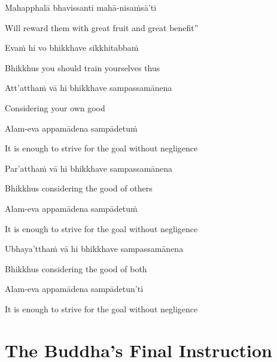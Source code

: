 Mahapphalā bhavissanti mahā-nisaṁsā'ti

\begin{cprenglish}
  Will reward them with great fruit and great benefit”
\end{cprenglish}

Evaṁ hi vo bhikkhave sikkhitabbaṁ

\begin{cprenglish}
  Bhikkhus you should train yourselves thus
\end{cprenglish}

Att’atthaṁ vā hi bhikkhave sampassamānena

\begin{cprenglish}
  Considering your own good
\end{cprenglish}

Alam-eva appamādena sampādetuṁ

\begin{cprenglish}
  It is enough to strive for the goal without negligence
\end{cprenglish}

Par’atthaṁ vā hi bhikkhave sampassamānena

\begin{cprenglish}
  Bhikkhus considering the good of others
\end{cprenglish}

Alam-eva appamādena sampādetuṁ

\begin{cprenglish}
  It is enough to strive for the goal without negligence
\end{cprenglish}

Ubhaya’tthaṁ vā hi bhikkhave sampassamānena

\begin{cprenglish}
  Bhikkhus considering the good of both
\end{cprenglish}

Alam-eva appamādena sampādetun'ti

\begin{cprenglish}
  It is enough to strive for the goal without negligence
\end{cprenglish}


\clearpage

\section{The Buddha's Final Instruction}


